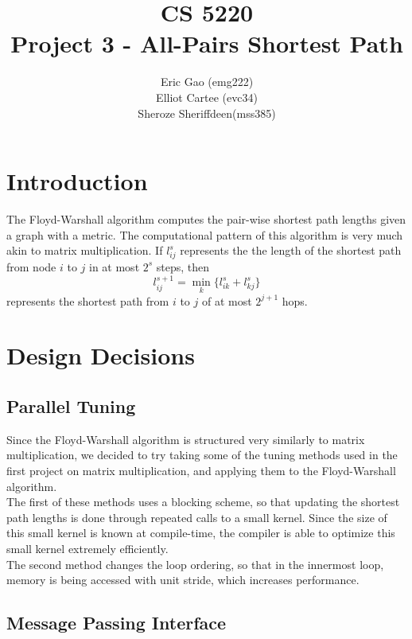 \documentclass[11pt]{article}
\begin{document}
\title{CS 5220\\ Project 3 - All-Pairs Shortest Path}
\author{Eric Gao (emg222)\\ Elliot Cartee (evc34)\\ Sheroze Sheriffdeen(mss385)}
\maketitle

\section{Introduction}
The Floyd-Warshall algorithm computes the pair-wise shortest path lengths given a graph with a metric. The computational pattern of this algorithm is very much akin to matrix multiplication. If $l_{ij}^s$ represents the the length of the shortest path from node $i$ to $j$ in at most $2^s$ steps, then
\begin{equation}
	l_{ij}^{s+1} = \min_k \{ l_{ik}^s + l_{kj}^s \}
\end{equation} 
 represents the shortest path from $i$ to $j$ of at most $2^{j+1}$ hops. \cite{writeup} 
\section{Design Decisions}
 
\subsection{Parallel Tuning}

Since the Floyd-Warshall algorithm is structured very similarly to matrix multiplication, we decided to try taking some of the tuning methods used in the first project on matrix multiplication, and applying them to the Floyd-Warshall algorithm. \\

The first of these methods uses a blocking scheme, so that updating the shortest path lengths is done through repeated calls to a small kernel. Since the size of this small kernel is known at compile-time, the compiler is able to optimize this small kernel extremely efficiently.  \\

The second method changes the loop ordering, so that in the innermost loop, memory is being accessed with unit stride, which increases performance. \\

\subsection{Message Passing Interface}\label{sec:mpi}
\end{document}
